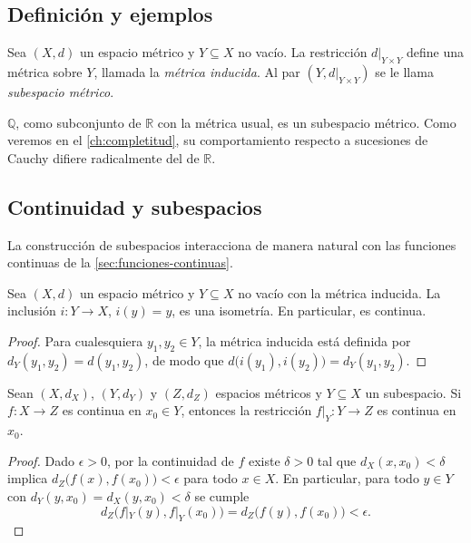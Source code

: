 \subsection{Definición y ejemplos}

\begin{definition}
\label{def:subespacio}
Sea $(X,d)$ un espacio métrico y $Y\subseteq X$ no vacío. La restricción $d|_{Y\times Y}$ define una métrica sobre $Y$, llamada la \emph{métrica inducida}. Al par $(Y,d|_{Y\times Y})$ se le llama \emph{subespacio métrico}.
\end{definition}

\begin{example}
$\mathbb{Q}$, como subconjunto de $\mathbb{R}$ con la métrica usual, es un subespacio métrico. Como veremos en el \cref{ch:completitud}, su comportamiento respecto a sucesiones de Cauchy difiere radicalmente del de $\mathbb{R}$.
\end{example}

\subsection{Continuidad y subespacios}

La construcción de subespacios interacciona de manera natural con las funciones continuas de la \cref{sec:funciones-continuas}.

\begin{proposition}
\label{prop:inclusion-isometria}
Sea $(X,d)$ un espacio métrico y $Y\subseteq X$ no vacío con la métrica inducida. La inclusión $i\colon Y\to X$, $i(y)=y$, es una isometría. En particular, es continua.
\end{proposition}
\begin{proof}
Para cualesquiera $y_1,y_2\in Y$, la métrica inducida está definida por $d_Y(y_1,y_2)=d(y_1,y_2)$, de modo que $d\bigl(i(y_1),i(y_2)\bigr)=d_Y(y_1,y_2)$.
\end{proof}

\begin{proposition}
\label{prop:restriccion-continua}
Sean $(X,d_X)$, $(Y,d_Y)$ y $(Z,d_Z)$ espacios métricos y $Y\subseteq X$ un subespacio. Si $f\colon X\to Z$ es continua en $x_0\in Y$, entonces la restricción $f|_Y\colon Y\to Z$ es continua en $x_0$.
\end{proposition}
\begin{proof}
Dado $\epsilon>0$, por la continuidad de $f$ existe $\delta>0$ tal que $d_X(x,x_0)<\delta$ implica $d_Z\bigl(f(x),f(x_0)\bigr)<\epsilon$ para todo $x\in X$. En particular, para todo $y\in Y$ con $d_Y(y,x_0)=d_X(y,x_0)<\delta$ se cumple
\[
  d_Z\bigl(f|_Y(y),f|_Y(x_0)\bigr)=d_Z\bigl(f(y),f(x_0)\bigr)<\epsilon.
\]
\end{proof}


